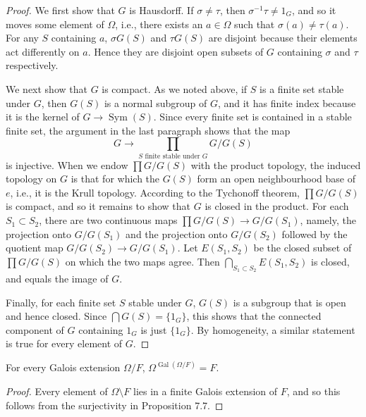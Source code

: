 \begin{proof}
We first show that $G$ is Hausdorff. If $\sigma\ne\tau$, then $\sigma^{-1}\tau\ne1_G$, and so it moves some element of $\Omega$, i.e., there exists an $a\in\Omega$ such that $\sigma(a)\ne\tau(a)$. For any $S$ containing $a$, $\sigma G(S)$ and $\tau G(S)$ are disjoint because their elements act differently on $a$. Hence they are disjoint open subsets of $G$ containing $\sigma$ and $\tau$ respectively.

We next show that $G$ is compact. As we noted above, if $S$ is a finite set stable under $G$, then $G(S)$ is a normal subgroup of $G$, and it has finite index because it is the kernel of $G\to\operatorname{Sym}(S)$. Since every finite set is contained in a stable finite set, the argument in the last paragraph shows that the map
\[
G\longrightarrow\prod_{S\text{ finite stable under }G}G/G(S)
\]
is injective. When we endow $\prod G/G(S)$ with the product topology, the induced topology on $G$ is that for which the $G(S)$ form an open neighbourhood base of $e$, i.e., it is the Krull topology. According to the Tychonoff theorem, $\prod G/G(S)$ is compact, and so it remains to show that $G$ is closed in the product. For each $S_1\subset S_2$, there are two continuous maps $\prod G/G(S)\to G/G(S_1)$, namely, the projection onto $G/G(S_1)$ and the projection onto $G/G(S_2)$ followed by the quotient map $G/G(S_2)\to G/G(S_1)$. Let $E(S_1,S_2)$ be the closed subset of $\prod G/G(S)$ on which the two maps agree. Then $\bigcap_{S_1\subset S_2}E(S_1,S_2)$ is closed, and equals the image of $G$.

Finally, for each finite set $S$ stable under $G$, $G(S)$ is a subgroup that is open and hence closed. Since $\bigcap G(S)=\{1_G\}$, this shows that the connected component of $G$ containing $1_G$ is just $\{1_G\}$. By homogeneity, a similar statement is true for every element of $G$.
\end{proof}
\begin{proposition}[7.9]
For every Galois extension $\Omega/F$, $\Omega^{\operatorname{Gal}(\Omega/F)}=F$.
\end{proposition}
\begin{proof}
Every element of $\Omega\setminus F$ lies in a finite Galois extension of $F$, and so this follows from the surjectivity in Proposition 7.7.
\end{proof}

